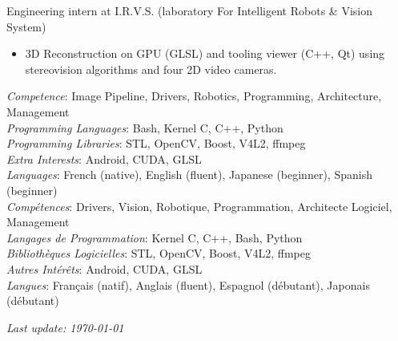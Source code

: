 \documentclass{article}
\begin{document}
\begin{llist}
 {
Engineering intern at I.R.V.S. (laboratory For Intelligent Robots \& Vision System)
\vspace{-0.33cm}
\begin{itemize}
\item 3D Reconstruction on GPU (GLSL) and tooling viewer (C++, Qt) using stereovision algorithms and four 2D video cameras.
\end{itemize}
} {}

 {
{\em Competence}: Image Pipeline, Drivers, Robotics, Programming, Architecture, Management \\
{\em Programming Languages}: Bash, Kernel C, C++, Python \\
{\em Programming Libraries}: STL, OpenCV, Boost, V4L2, ffmpeg \\
{\em Extra Interests}: Android, CUDA, GLSL \\
{\em Languages}: French (native), English (fluent), Japanese (beginner), Spanish
(beginner) \\
} {
{\em Comp\'{e}tences}: Drivers, Vision, Robotique, Programmation, Architecte Logiciel,
Management \\
{\em Langages de Programmation}: Kernel C, C++, Bash, Python \\
{\em Biblioth\`{e}ques Logicielles}: STL, OpenCV, Boost, V4L2, ffmpeg \\
{\em Autres Int\'{e}r\^{e}ts}: Android, CUDA, GLSL \\
{\em Langues}: Fran\c{c}ais (natif), Anglais (fluent), Espagnol (d\'{e}butant),
Japonais (d\'{e}butant) \\
}


\end{llist}

{\em Last update: \today}
\end{document}
